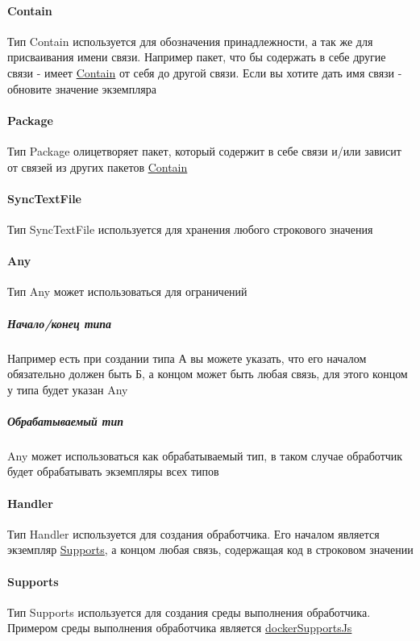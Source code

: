 \documentclass{article}
\begin{document}
\paragraph*{Contain}\hypertarget{Core.Contain.Description}{}
Тип Contain используется для обозначения
принадлежности, а так же для присваивания имени связи. Например пакет, что бы
содержать в себе другие связи - имеет
\hyperlink{Core.Contain.Description}{Contain} от себя
до другой связи. Если вы хотите дать имя связи - обновите значение экземпляра
\paragraph*{Package}\hypertarget{Core.Package.Description}{}
Тип Package олицетворяет пакет, который содержит в себе связи и/или зависит от
связей из других пакетов
\hyperlink{Core.Contain.Description}{Contain}
\paragraph*{SyncTextFile}\hypertarget{Core.SyncTextFile.Description}{}
Тип SyncTextFile используется для хранения
любого строкового значения
\paragraph*{Any}\hypertarget{Core.Any.Description}{}
Тип Any может использоваться для ограничений
\subparagraph*{Начало/конец типа}
Например есть при создании типа А вы можете указать, что его началом
обязательно должен быть Б, а концом может быть любая связь, для этого концом у
типа будет указан Any
\subparagraph*{Обрабатываемый тип}
Any может использоваться как обрабатываемый тип, в таком случае обработчик
будет обрабатывать экземпляры всех типов
\paragraph*{Handler}\hypertarget{Core.Handler.Description}{}
Тип Handler используется для создания обработчика.
Его началом является экземпляр \hyperlink{supports.Description}{Supports}, а
концом
любая связь, содержащая код в строковом значении
\paragraph*{Supports}\hypertarget{Core.Supports.Description}{}
Тип Supports используется для создания среды
выполнения обработчика. Примером среды выполнения обработчика является
\hyperlink{Core.dockerSupportsJs.Description}{dockerSupportsJs}
\end{document}

